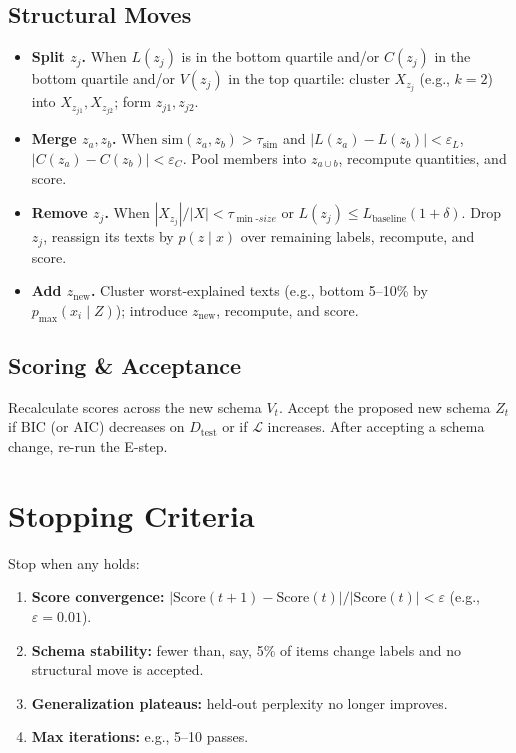 \documentclass[11pt]{article}
\begin{document}
\subsection{Structural Moves}
\begin{itemize}[leftmargin=1.3em]
  \item \textbf{Split $z_j$.} When $L(z_j)$ is in the bottom quartile and/or $C(z_j)$ in the bottom quartile and/or $V(z_j)$ in the top quartile: cluster $X_{z_j}$ (e.g., $k=2$) into $X_{z_{j1}}, X_{z_{j2}}$; form $z_{j1}, z_{j2}$.
  \item \textbf{Merge $z_a, z_b$.} When $\mathrm{sim}(z_a, z_b) > \tau_{\mathrm{sim}}$ and $|L(z_a)-L(z_b)| < \varepsilon_L$, $|C(z_a)-C(z_b)| < \varepsilon_C$. Pool members into $z_{a\cup b}$, recompute quantities, and score.
  \item \textbf{Remove $z_j$.} When $|X_{z_j}|/|X| < \tau_{\min\text{-}size}$ or $L(z_j) \le L_{\mathrm{baseline}}(1+\delta)$. Drop $z_j$, reassign its texts by $p(z\mid x)$ over remaining labels, recompute, and score.
  \item \textbf{Add $z_{\mathrm{new}}$.} Cluster worst-explained texts (e.g., bottom 5--10\% by $p_{\max}(x_i \mid Z)$); introduce $z_{\mathrm{new}}$, recompute, and score.
\end{itemize}

\subsection{Scoring \& Acceptance}
Recalculate scores across the new schema $V_t$. Accept the proposed new schema $Z_t$ if $\mathrm{BIC}$ (or $\mathrm{AIC}$) decreases on $D_{\mathrm{test}}$ or if $\mathcal{L}$ increases. After accepting a schema change, re-run the E-step.

\section{Stopping Criteria}
Stop when any holds:
\begin{enumerate}[leftmargin=1.3em]
  \item \textbf{Score convergence:} $\left|\mathrm{Score}(t{+}1)-\mathrm{Score}(t)\right| / \left|\mathrm{Score}(t)\right| < \varepsilon$ (e.g., $\varepsilon = 0.01$).
  \item \textbf{Schema stability:} fewer than, say, 5\% of items change labels and no structural move is accepted.
  \item \textbf{Generalization plateaus:} held-out perplexity no longer improves.
  \item \textbf{Max iterations:} e.g., 5--10 passes.
\end{enumerate}
\end{document}
